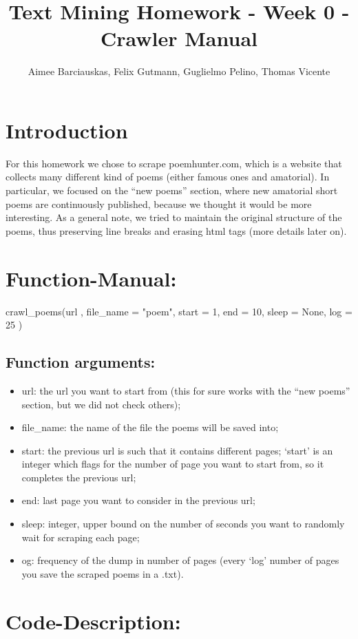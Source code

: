 \documentclass[11pt]{article}
\author{Aimee Barciauskas, Felix Gutmann, Guglielmo Pelino, Thomas Vicente}
\title{Text Mining Homework - Week 0 - Crawler Manual}
\begin{document}
\maketitle
\pagebreak
\section*{Introduction}	

For this homework we chose to scrape poemhunter.com, which is a website that collects many different kind of poems (either famous ones and amatorial).
In particular, we focused on the “new poems” section, where new amatorial short poems are continuously published, because we thought it would be more interesting.
As a general note, we tried to maintain the original structure of the poems, thus preserving line breaks and erasing html tags (more details later on).

\section*{Function-Manual:}

crawl\_poems(url , file\_name = "poem", start = 1, end = 10, sleep = None, log = 25 )

\subsection*{Function arguments:}

\begin{itemize}
\item url: the url you want to start from (this for sure works with the “new poems” section, but we did not check others);
\item file\_name: the name of the file the poems will be saved into;
\item start: the previous url is such that it contains different pages; ‘start’ is an integer which flags for the number of page you want to start from, so it completes the previous url;
\item end: last page you want to consider in the previous url;
\item sleep: integer, upper bound on the number of seconds you want to randomly wait for scraping each page;
\item og: frequency of the dump in number of pages (every ‘log’ number of pages you save the scraped poems in a .txt).
\end{itemize}

\section*{Code-Description:}
\end{document}
